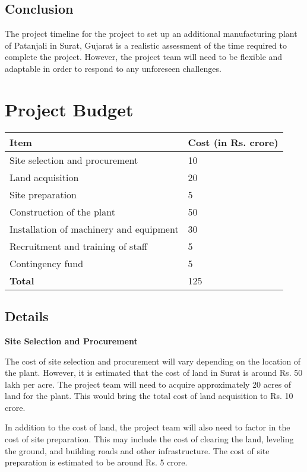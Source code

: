 \subsection{Conclusion}

The project timeline for the project to set up an additional manufacturing plant of Patanjali in Surat, Gujarat is a realistic assessment of the time required to complete the project. However, the project team will need to be flexible and adaptable in order to respond to any unforeseen challenges.



\section{Project Budget}

\begin{tabularx}{\textwidth}{|X|X|}
\hline
\textbf{Item} & \textbf{Cost (in Rs. crore)} \\
\hline
Site selection and procurement & 10 \\
Land acquisition & 20 \\
Site preparation & 5 \\
Construction of the plant & 50 \\
Installation of machinery and equipment & 30 \\
Recruitment and training of staff & 5 \\
Contingency fund & 5 \\
\hline
\textbf{Total} & 125 \\
\hline
\end{tabularx}

\subsection{Details}

\textbf{Site Selection and Procurement}

The cost of site selection and procurement will vary depending on the location of the plant. However, it is estimated that the cost of land in Surat is around Rs. 50 lakh per acre. The project team will need to acquire approximately 20 acres of land for the plant. This would bring the total cost of land acquisition to Rs. 10 crore.

In addition to the cost of land, the project team will also need to factor in the cost of site preparation. This may include the cost of clearing the land, leveling the ground, and building roads and other infrastructure. The cost of site preparation is estimated to be around Rs. 5 crore.

